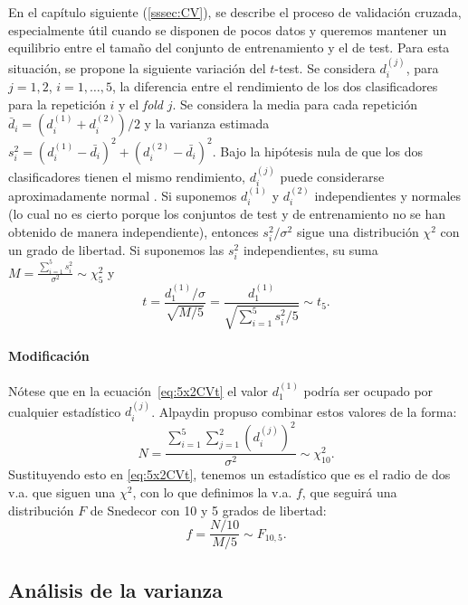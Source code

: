 	En el capítulo siguiente (\ref{sssec:CV}), se describe el 
proceso de validación cruzada, especialmente útil cuando se
disponen de pocos datos y queremos mantener un equilibrio
entre el tamaño del conjunto de entrenamiento y el de test.
Para esta situación, se propone la siguiente variación 
del $t$-test. Se considera $d_i^{(j)}$, para $j=1,2$, $i=
1,\dots,5$, la diferencia entre el rendimiento de los dos
clasificadores para la repetición $i$ y el \textit{fold} $j$.
Se considera la media para cada repetición $\bar{d}_i = 
(d_i^{(1)} + d_i^{(2)})/2$ y la varianza estimada
$s_i^2 = (d_i^{(1)}-\bar{d_i})^2 + (d_i^{(2)}-\bar{d_i})^2$. 
Bajo la hipótesis nula de que los dos clasificadores tienen 
el mismo rendimiento, $d_i^{(j)}$ puede considerarse 
aproximadamente normal . Si suponemos $d_i^{(1)}$ y 
$d_i^{(2)}$ independientes y normales (lo cual no es
cierto porque los conjuntos de test y de entrenamiento
no se han obtenido de manera independiente), entonces
$s_i^2/\sigma^2$ sigue una distribución $\chi^2$ con un
grado de libertad. Si suponemos las $s_i^2$ independientes,
su suma $M = \frac{\sum\limits_{i=1}^5 s_i^2}{\sigma^2}
\sim \chi^2_5$ y 
\begin{equation}
	\label{eq:5x2CVt}
	t = \frac{d_1^{(1)}/\sigma}{\sqrt{M/5}} = 
		\frac{d_1^{(1)}}
			{\sqrt{\sum\limits_{i=1}^5 s_i^2/5}}
		\sim t_5.
\end{equation}

\paragraph{Modificación} Nótese que en la 
ecuación~\ref{eq:5x2CVt} el valor $d_1^(1)$ podría ser
ocupado por cualquier estadístico $d_i^(j)$. Alpaydin
propuso combinar estos valores de la forma:
	\[
		N = \frac{\sum\limits_{i=1}^5
				\sum\limits_{j=1}^2
					\left( d_i^{(j)} \right)^2}
				{\sigma^2}
			\sim \chi_{10}^2.
	\]
	Sustituyendo esto en \ref{eq:5x2CVt}, tenemos
un estadístico que es el radio de dos v.a. que siguen 
una $\chi^2$, con lo que definimos la v.a. $f$, que seguirá
una distribución $F$ de Snedecor con 10 y 5 grados de
libertad:
	\[ 
		f = \frac{N/10}{M/5} \sim F_{10,5}.
	\]
	
		
\subsection{Análisis de la varianza}

